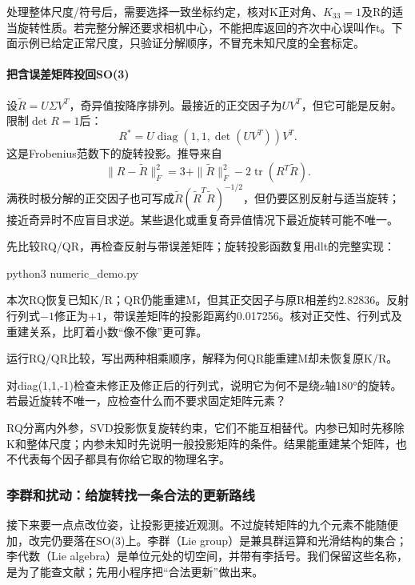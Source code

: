 处理整体尺度/符号后，需要选择一致坐标约定，核对K正对角、$K_{33}=1$及R的适当旋转性质。若完整分解还要求相机中心，不能把库返回的齐次中心误叫作t。下面示例已给定正常尺度，只验证分解顺序，不冒充未知尺度的全套标定。

\paragraph*{把含误差矩阵投回SO(3)}
\label{sec:DLT的极分解求解}
设$\tilde R=U\Sigma V^T$，奇异值按降序排列。最接近的正交因子为$UV^T$，但它可能是反射。限制$\det R=1$后：
\[
R^*=U\operatorname{diag}(1,1,\det(UV^T))V^T.
\]
这是Frobenius范数下的旋转投影。推导来自
\[
\|R-\tilde R\|_F^2=3+\|\tilde R\|_F^2-2\operatorname{tr}(R^T\tilde R).
\]
满秩时极分解的正交因子也可写成$\tilde R(\tilde R^T\tilde R)^{-1/2}$，但仍要区别反射与适当旋转；接近奇异时不应盲目求逆。某些退化或重复奇异值情况下最近旋转可能不唯一。

\begin{example}[两种操作分开核对]
先比较RQ/QR，再检查反射与带误差矩阵；旋转投影函数复用dlt的完整实现：

\begin{tbash}
python3 numeric_demo.py
\end{tbash}
本次RQ恢复已知K/R；QR仍能重建M，但其正交因子与原R相差约2.82836。反射行列式$-1$修正为$+1$，带误差矩阵的投影距离约0.017256。核对正交性、行列式及重建关系，比盯着小数“像不像”更可靠。
\end{example}
\begin{exercise}\label{ex:v2-ba-rq}
运行RQ/QR比较，写出两种相乘顺序，解释为何QR能重建M却未恢复原K/R。
\end{exercise}
\begin{exercise}\label{ex:v2-ba-rotation}
对diag(1,1,-1)检查未修正及修正后的行列式，说明它为何不是绕z轴180°的旋转。若最近旋转不唯一，应检查什么而不要求固定矩阵元素？
\end{exercise}
\begin{conclusion}
RQ分离内外参，SVD投影恢复旋转约束，它们不能互相替代。内参已知时先移除K和整体尺度；内参未知时先说明一般投影矩阵的条件。结果能重建某个矩阵，也不代表每个因子都具有你给它取的物理名字。
\end{conclusion}

\subsubsection{李群和扰动：给旋转找一条合法的更新路线}
\label{sec:李代数}
接下来要一点点改位姿，让投影更接近观测。不过旋转矩阵的九个元素不能随便加，改完仍要落在SO(3)上。李群（Lie group）是兼具群运算和光滑结构的集合；李代数（Lie algebra）是单位元处的切空间，并带有李括号。我们保留这些名称，是为了能查文献；先用小程序把“合法更新”做出来。

